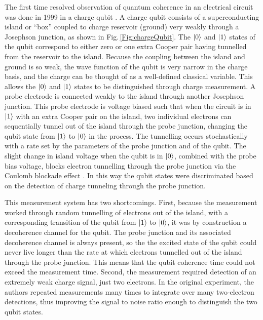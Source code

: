 The first time resolved observation of quantum coherence in an electrical circuit was done in 1999 in a charge qubit \cite{Nakamura:qubit1999}.
A charge qubit consists of a superconducting island or ``box'' coupled to charge reservoir (ground) very weakly through a Josephson junction, as shown in Fig.\,\ref{Fig:chargeQubit}.
The $|0\rangle$ and $|1\rangle$ states of the qubit correspond to either zero or one extra Cooper pair having tunnelled from the reservoir to the island.
Because the coupling between the island and ground is so weak, the wave function of the qubit is very narrow in the charge basis, and the charge can be thought of as a well-defined classical variable.
This allows the $|0\rangle$ and $|1\rangle$ states to be distinguished through charge measurement.
A probe electrode is connected weakly to the island through another Josephson junction.
This probe electrode is voltage biased such that when the circuit is in $|1\rangle$ with an extra Cooper pair on the island, two individual electrons can sequentially tunnel out of the island through the probe junction, changing the qubit state from $|1\rangle$ to $|0\rangle$ in the process.
The tunnelling occurs stochastically with a rate set by the parameters of the probe junction and of the qubit.
The slight change in island voltage when the qubit is in $|0\rangle$, combined with the probe bias voltage, blocks electron tunnelling through the probe junction via the Coulomb blockade effect \cite{Nakamura:qubit2002}.
In this way the qubit states were discriminated based on the detection of charge tunneling through the probe junction.

This measurement system has two shortcomings.
First, because the measurement worked through random tunnelling of electrons out of the island, with a corresponding transition of the qubit from $|1\rangle$ to $|0\rangle$, it was by construction a decoherence channel for the qubit.
The probe junction and its associated decoherence channel is always present, so the the excited state of the qubit could never live longer than the rate at which electrons tunnelled out of the island through the probe junction.
This means that the qubit coherence time could not exceed the measurement time.
Second, the measurement required detection of an extremely weak charge signal, just two electrons.
In the original experiment, the authors repeated measurements many times to integrate over many two-electron detections, thus improving the signal to noise ratio enough to distinguish the two qubit states.

